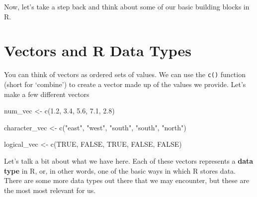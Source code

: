 \documentclass[
  letterpaper,
  DIV=11,
  numbers=noendperiod]{scrreprt}
\newenvironment{Shaded}{\begin{snugshade}}{\end{snugshade}}
\newcommand{\ConstantTok}[1]{\textcolor[rgb]{0.56,0.35,0.01}{#1}}
\newcommand{\FloatTok}[1]{\textcolor[rgb]{0.68,0.00,0.00}{#1}}
\newcommand{\FunctionTok}[1]{\textcolor[rgb]{0.28,0.35,0.67}{#1}}
\newcommand{\NormalTok}[1]{\textcolor[rgb]{0.00,0.23,0.31}{#1}}
\newcommand{\OtherTok}[1]{\textcolor[rgb]{0.00,0.23,0.31}{#1}}
\newcommand{\StringTok}[1]{\textcolor[rgb]{0.13,0.47,0.30}{#1}}
\begin{document}
Now, let's take a step back and think about some of our basic building
blocks in R.

\section{Vectors and R Data Types}\label{vectors-and-r-data-types}

You can think of vectors as ordered sets of values. We can use the
\texttt{c()} function (short for `combine') to create a vector made up
of the values we provide. Let's make a few different vectors

\begin{Shaded}
\begin{Highlighting}[]
\NormalTok{num\_vec }\OtherTok{\textless{}{-}} \FunctionTok{c}\NormalTok{(}\FloatTok{1.2}\NormalTok{, }\FloatTok{3.4}\NormalTok{, }\FloatTok{5.6}\NormalTok{, }\FloatTok{7.1}\NormalTok{, }\FloatTok{2.8}\NormalTok{)}

\NormalTok{character\_vec }\OtherTok{\textless{}{-}} \FunctionTok{c}\NormalTok{(}\StringTok{"east"}\NormalTok{, }\StringTok{"west"}\NormalTok{, }\StringTok{"south"}\NormalTok{, }\StringTok{"south"}\NormalTok{, }\StringTok{"north"}\NormalTok{) }

\NormalTok{logical\_vec }\OtherTok{\textless{}{-}} \FunctionTok{c}\NormalTok{(}\ConstantTok{TRUE}\NormalTok{, }\ConstantTok{FALSE}\NormalTok{, }\ConstantTok{TRUE}\NormalTok{, }\ConstantTok{FALSE}\NormalTok{, }\ConstantTok{FALSE}\NormalTok{) }
\end{Highlighting}
\end{Shaded}

Let's talk a bit about what we have here. Each of these vectors
represents a \textbf{data type} in R, or, in other words, one of the
basic ways in which R stores data. There are some more data types out
there that we may encounter, but these are the most most relevant for
us.
\end{document}
